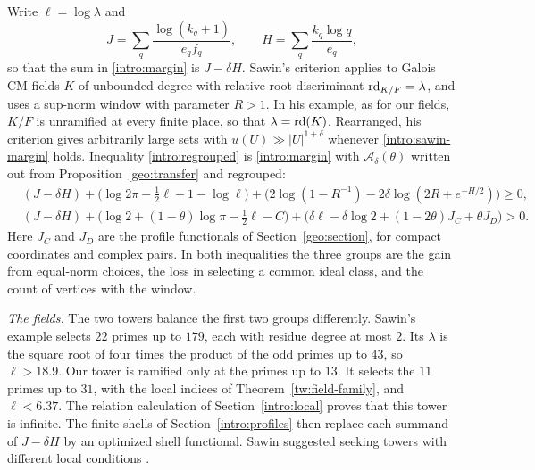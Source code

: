 Write $\ell=\log\lambda$ and
\[
 J=\sum_q\frac{\log(k_q+1)}{e_qf_q},\qquad
 H=\sum_q\frac{k_q\log q}{e_q},
\]
so that the sum in \eqref{intro:margin} is $J-\delta H$. Sawin's
criterion \cite[Proposition~10]{Sawin2026} applies to Galois CM fields
$K$ of unbounded degree with relative root discriminant
$\operatorname{rd}_{K/F}=\lambda$, and uses a sup-norm window with parameter $R>1$.
In his example, as for our fields, $K/F$ is unramified at every finite
place, so that $\lambda=\operatorname{rd}(K)$. Rearranged, his criterion gives
arbitrarily large sets with $u(U)\gg|U|^{1+\delta}$ whenever
\eqref{intro:sawin-margin} holds. Inequality \eqref{intro:regrouped} is
\eqref{intro:margin} with $\mathcal A_\delta(\theta)$ written out from
Proposition~\ref{geo:transfer} and regrouped:
\begin{align}
 &(J-\delta H)+\bigl(\log2\pi-\tfrac12\ell-1-\log\ell\bigr)
 +\bigl(2\log(1-R^{-1})-2\delta\log(2R+e^{-H/2})\bigr)\ge0,
 \label{intro:sawin-margin}\\
 &(J-\delta H)+\bigl(\log2+(1-\theta)\log\pi-\tfrac12\ell-C\bigr)
 +\bigl(\delta\ell-\delta\log2+(1-2\theta)J_C+\theta J_D\bigr)>0.
 \label{intro:regrouped}
\end{align}
Here $J_C$ and $J_D$ are the profile functionals of
Section~\ref{geo:section}, for compact coordinates and complex pairs.
In both inequalities the three groups are the gain from equal-norm
choices, the loss in selecting a common ideal class, and the count of
vertices with the window.

\emph{The fields.} The two towers balance the first two groups
differently. Sawin's example selects $22$ primes up to $179$, each with
residue degree at most $2$. Its $\lambda$ is the square root of four
times the product of the odd primes up to $43$, so $\ell>18.9$. Our
tower is ramified only at the primes up to $13$. It selects the $11$
primes up to $31$, with the local indices of
Theorem~\ref{tw:field-family}, and $\ell<6.37$. The relation
calculation of Section~\ref{intro:local} proves that this tower is
infinite.
The finite shells of Section~\ref{intro:profiles} then replace each
summand of $J-\delta H$ by an optimized shell functional. Sawin
suggested seeking towers with different local conditions
\cite{Sawin2026}.


